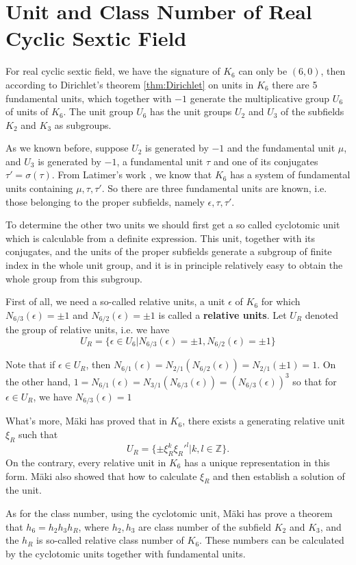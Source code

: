 \section{Unit and Class Number of Real Cyclic Sextic Field}
For real cyclic sextic field, we  have the signature of $K_6$ can only be $(6,0)$, then according to Dirichlet's theorem \ref{thm:Dirichlet} on units in $K_6$ there are 5 fundamental units, which together with $-1$ generate the multiplicative group $U_6$ of units of $K_6$. The unit group $U_6$ has the unit groups $U_2$ and $U_3$ of the subfields $K_2$ and $K_3$ as subgroups. 

As we known before, suppose $U_2$ is generated by $-1$ and the fundamental unit $\mu$, and $U_3$ is generated by $-1$, a fundamental unit $\tau$ and one of its conjugates $\tau'=\sigma(\tau)$. From Latimer's work \citep{latimer1934units}, we know that $K_6$ has a system of fundamental units containing $\mu,\tau,\tau'$. So there are three fundamental units are known, i.e. those belonging to the proper subfields, namely $\epsilon,\tau,\tau'$.  

To determine the other two units we should first get a so called cyclotomic unit which is calculable from a definite expression. This unit, together with its conjugates, and the units of the proper subfields generate a subgroup of finite index in the whole unit group, and it is in principle relatively easy to obtain the whole group from this subgroup.

First of all, we need a so-called relative units, a unit $\epsilon$ of $K_6$ for which $N_{6/3}(\epsilon)=\pm1$ and $N_{6/2}(\epsilon)=\pm1$ is called a \textbf{relative units}. Let $U_R$ denoted the group of relative units, i.e. we have $$U_R=\{\epsilon\in U_6|N_{6/3}(\epsilon)=\pm1,N_{6/2}(\epsilon)=\pm1\}$$

Note that if $\epsilon\in U_R$, then $N_{6/1}(\epsilon)=N_{2/1}(N_{6/2}(\epsilon))=N_{2/1}(\pm1)=1$. On the other hand, $1=N_{6/1}(\epsilon)=N_{3/1}(N_{6/3}(\epsilon))=(N_{6/3}(\epsilon))^3$ so that for $\epsilon\in U_R$, we have $N_{6/3}(\epsilon)=1$

What's more, M\"{a}ki has proved that in $K_6$, there exists a generating relative unit $\xi_R$ such that $$U_R=\{\pm\xi_R^k\xi_R'^l|k,l\in\mathbb{Z}\}.$$ On the contrary, every relative unit in $K_6$ has a unique representation in this form. M\"{a}ki also showed that how to calculate $\xi_R$ and then establish a solution of the unit.

As for the class number, using the cyclotomic unit, M\"{a}ki has prove a theorem that $h_6=h_2h_3h_R$, where $h_2,h_3$ are class number of the subfield $K_2$ and $K_3$, and the $h_R$ is so-called relative class number of $K_6$. These numbers can be calculated by the cyclotomic units together with fundamental units.

